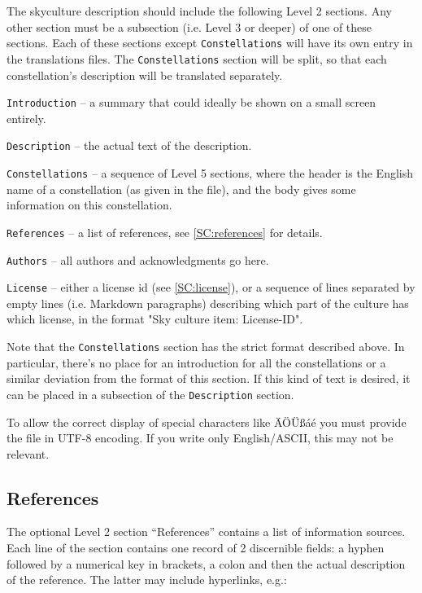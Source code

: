 The skyculture description should include the following Level 2 sections. Any other section must be a subsection (i.e. Level 3 or deeper) of one of these sections. Each of these sections except \texttt{Constellations} will have its own entry in the translations files. The \texttt{Constellations} section will be split, so that each constellation's description will be translated separately.

\begin{description}
\item \texttt{Introduction} -- a summary that could ideally be shown on a small screen entirely.
\item \texttt{Description} -- the actual text of the description.
\item \texttt{Constellations} -- a sequence of Level 5 sections, where the header is the English name of a constellation (as given in the  file), and the body gives some information on this constellation.
\item \texttt{References} -- a list of references, see \ref{SC:references} for details.
\item \texttt{Authors} -- all authors and acknowledgments go here.
\item \texttt{License} -- either a license id (see \ref{SC:license}), or a sequence of lines separated by empty lines (i.e. Markdown paragraphs) describing which part of the culture has which license, in the format "Sky culture item: License-ID".
\end{description}

Note that the \texttt{Constellations} section has the strict format described above. In particular, there's no place for an introduction for all the constellations or a similar deviation from the format of this section. If this kind of text is desired, it can be placed in a subsection of the \texttt{Description} section.

To allow the correct display of special characters like ÄÖÜßáé you must provide the file in UTF-8 encoding. 
If you write only English/ASCII, this may not be relevant.


\subsection{References}
\label{sec:skycultures:references}
\label{SC:references}

The optional Level 2 section ``References'' contains a list of information sources. 
Each line of the section contains one record of 2 discernible fields: 
a hyphen followed by a numerical key in brackets, 
a colon and then the actual description of the reference. The latter may include hyperlinks,
 e.g.:


